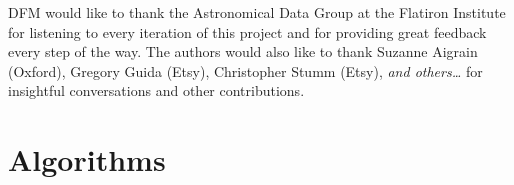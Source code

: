 \documentclass[modern]{aastex631}
\begin{document}
\begin{acknowledgments}
    DFM would like to thank the Astronomical Data Group at the Flatiron Institute for listening to every iteration of this project and for providing great feedback every step of the way.
    The authors would also like to thank
    Suzanne Aigrain (Oxford),
    Gregory Guida (Etsy),
    Christopher Stumm (Etsy),
    \emph{and others\ldots}
    for insightful conversations and other contributions.
\end{acknowledgments}


\appendix
\section{Algorithms}




\end{document}
